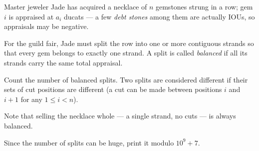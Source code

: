 Master jeweler Jade has acquired a necklace of $n$ gemstones strung in a row; gem $i$ is appraised at $a_i$ ducats --- a few \emph{debt stones} among them are actually IOUs, so appraisals may be negative.

For the guild fair, Jade must split the row into one or more contiguous strands so that every gem belongs to exactly one strand. A split is called \emph{balanced} if all its strands carry the same total appraisal.

Count the number of balanced splits. Two splits are considered different if their sets of cut positions are different (a cut can be made between positions $i$ and $i+1$ for any $1 \le i < n$).

Note that selling the necklace whole --- a single strand, no cuts --- is always balanced.

Since the number of splits can be huge, print it modulo $10^9 + 7$.
